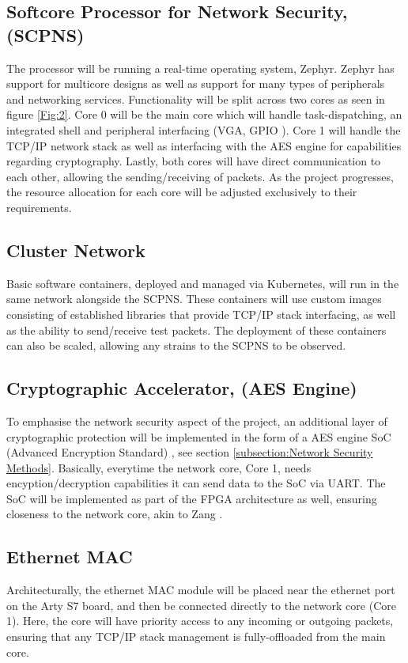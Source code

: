 \subsection{Softcore Processor for Network Security, (SCPNS)}
The processor will be running a real-time operating system, Zephyr. Zephyr has support for multicore designs as well as support for many types of peripherals and networking services. Functionality will be split across two cores as seen in figure \ref{Fig:2}. Core 0 will be the main core which will handle task-dispatching, an integrated shell and peripheral interfacing (VGA, GPIO \etc). Core 1 will handle the TCP/IP network stack as well as interfacing with the AES engine for capabilities regarding cryptography. Lastly, both cores will have direct communication to each other, allowing the sending/receiving of packets. As the project progresses, the resource allocation for each core will be adjusted exclusively to their requirements.

\subsection{Cluster Network}
Basic software containers, deployed and managed via Kubernetes, will run in the same network alongside the SCPNS. These containers will use custom images consisting of established libraries that provide TCP/IP stack interfacing, as well as the ability to send/receive test packets. The deployment of these containers can also be scaled, allowing any strains to the SCPNS to be observed.

\subsection{Cryptographic Accelerator, (AES Engine)}
To emphasise the network security aspect of the project, an additional layer of cryptographic protection will be implemented in the form of a AES engine SoC (Advanced Encryption Standard) \cite{CASTInc2024}, see section \ref{subsection:Network Security Methods}. Basically, everytime the network core, Core 1, needs encyption/decryption capabilities it can send data to the SoC via UART. The SoC will be implemented as part of the FPGA architecture as well, ensuring closeness to the network core, akin to Zang \etal \cite{Zang2019}. 

\subsection{Ethernet MAC}
Architecturally, the ethernet MAC module will be placed near the ethernet port on the Arty S7 board, and then be connected directly to the network core (Core 1). Here, the core will have priority access to any incoming or outgoing packets, ensuring that any TCP/IP stack management is fully-offloaded from the main core.